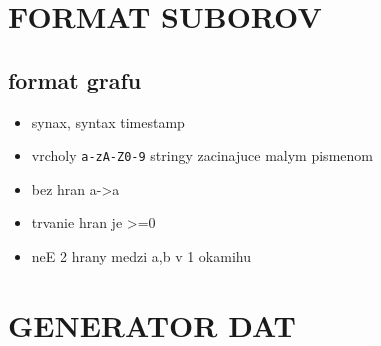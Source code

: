 \documentclass[11pt, a4paper,draft]{article}
\theoremstyle{plain}
\theoremstyle{definition}
\theoremstyle{remark}
\begin{document}
\section{FORMAT SUBOROV}

\subsection{format grafu}
\begin{itemize}
    \item synax, syntax timestamp
    \item vrcholy \texttt{a-zA-Z0-9} stringy zacinajuce malym pismenom
    \item bez hran a->a
    \item trvanie hran je >=0
    \item neE 2 hrany medzi a,b v 1 okamihu
\end{itemize}

\section{GENERATOR DAT}
\end{document}
